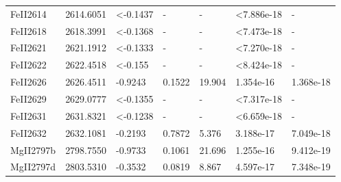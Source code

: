 \begin{tabular}{lrlllll}
   FeII2614 &  2614.6051 &  <-0.1437 &         - &        - &  <7.886e-18 &          - \\
   FeII2618 &  2618.3991 &  <-0.1368 &         - &        - &  <7.473e-18 &          - \\
   FeII2621 &  2621.1912 &  <-0.1333 &         - &        - &  <7.270e-18 &          - \\
   FeII2622 &  2622.4518 &   <-0.155 &         - &        - &  <8.424e-18 &          - \\
   FeII2626 &  2626.4511 &   -0.9243 &    0.1522 &   19.904 &   1.354e-16 &  1.368e-18 \\
   FeII2629 &  2629.0777 &  <-0.1355 &         - &        - &  <7.317e-18 &          - \\
   FeII2631 &  2631.8321 &  <-0.1238 &         - &        - &  <6.659e-18 &          - \\
   FeII2632 &  2632.1081 &   -0.2193 &    0.7872 &    5.376 &   3.188e-17 &  7.049e-18 \\
  MgII2797b &  2798.7550 &   -0.9733 &    0.1061 &   21.696 &   1.255e-16 &  9.412e-19 \\
  MgII2797d &  2803.5310 &   -0.3532 &    0.0819 &    8.867 &   4.597e-17 &  7.348e-19 \\
\bottomrule
\end{tabular}
